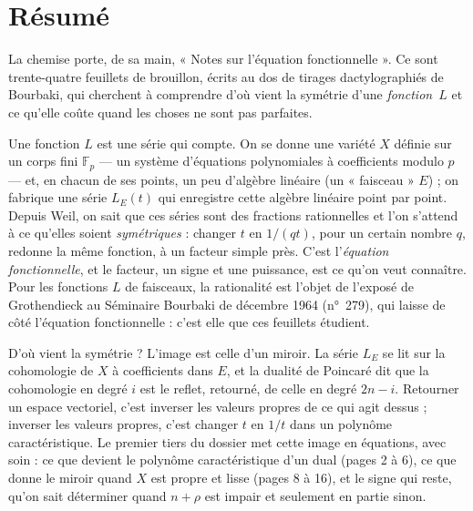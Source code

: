 \documentclass[11pt,a4paper]{article}
\begin{document}
\section*{Résumé}

\begin{resume}
La chemise porte, de sa main, « Notes sur l'équation fonctionnelle ». Ce sont
trente-quatre feuillets de brouillon, écrits au dos de tirages dactylographiés
de Bourbaki, qui cherchent à comprendre d'où vient la symétrie d'une
\emph{fonction~$L$} et ce qu'elle coûte quand les choses ne sont pas parfaites.

Une fonction $L$ est une série qui compte. On se donne une variété $X$ définie
sur un corps fini $\mathbb{F}_p$ --- un système d'équations polynomiales à
coefficients modulo $p$ --- et, en chacun de ses points, un peu d'algèbre
linéaire (un « faisceau » $E$) ; on fabrique une série $L_E(t)$ qui enregistre
cette algèbre linéaire point par point. Depuis Weil, on sait que ces séries
sont des fractions rationnelles et l'on s'attend à ce qu'elles soient
\emph{symétriques} : changer $t$ en $1/(qt)$, pour un certain nombre $q$,
redonne la même fonction, à un facteur simple près. C'est l'\emph{équation
fonctionnelle}, et le facteur, un signe et une puissance, est ce qu'on veut
connaître. Pour les fonctions $L$ de faisceaux, la rationalité est l'objet de l'exposé de Grothendieck au Séminaire Bourbaki de décembre 1964 (n°~279), qui laisse de côté l'équation fonctionnelle : c'est elle que ces feuillets étudient.

D'où vient la symétrie ? L'image est celle d'un miroir. La série $L_E$ se lit
sur la cohomologie de $X$ à coefficients dans $E$, et la dualité de Poincaré
dit que la cohomologie en degré $i$ est le reflet, retourné, de celle en
degré $2n-i$. Retourner un espace vectoriel, c'est inverser les valeurs propres
de ce qui agit dessus ; inverser les valeurs propres, c'est changer $t$ en
$1/t$ dans un polynôme caractéristique. Le premier tiers du dossier met cette
image en équations, avec soin : ce que devient le polynôme caractéristique
d'un dual (pages 2 à 6), ce que donne le miroir quand $X$ est propre et lisse
(pages 8 à 16), et le signe qui reste, qu'on sait déterminer quand
$n + \rho$ est impair et seulement en partie sinon.


\end{resume}
\end{document}
